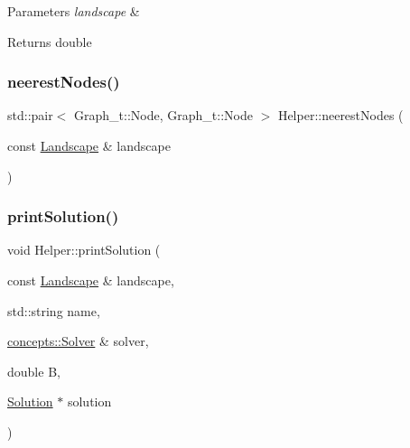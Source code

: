 \begin{DoxyParams}{Parameters}
{\em landscape} & \\
\hline
\end{DoxyParams}
\begin{DoxyReturn}{Returns}
double 
\end{DoxyReturn}
\mbox{\label{namespace_helper_ad2822186832ad10787811db7d44d60cd}} 
\subsubsection{\texorpdfstring{neerest\+Nodes()}{neerestNodes()}}
{\footnotesize\ttfamily std\+::pair$<$ Graph\+\_\+t\+::\+Node, Graph\+\_\+t\+::\+Node $>$ Helper\+::neerest\+Nodes (\begin{DoxyParamCaption}\item[{const \hyperlink{class_landscape}{Landscape} \&}]{landscape }\end{DoxyParamCaption})}

\mbox{\label{namespace_helper_a3cc49f3178d4ab02f9253076fe399df7}} 
\subsubsection{\texorpdfstring{print\+Solution()}{printSolution()}}
{\footnotesize\ttfamily void Helper\+::print\+Solution (\begin{DoxyParamCaption}\item[{const \hyperlink{class_landscape}{Landscape} \&}]{landscape,  }\item[{std\+::string}]{name,  }\item[{\hyperlink{classconcepts_1_1_solver}{concepts\+::\+Solver} \&}]{solver,  }\item[{double}]{B,  }\item[{\hyperlink{class_solution}{Solution} $\ast$}]{solution }\end{DoxyParamCaption})}

